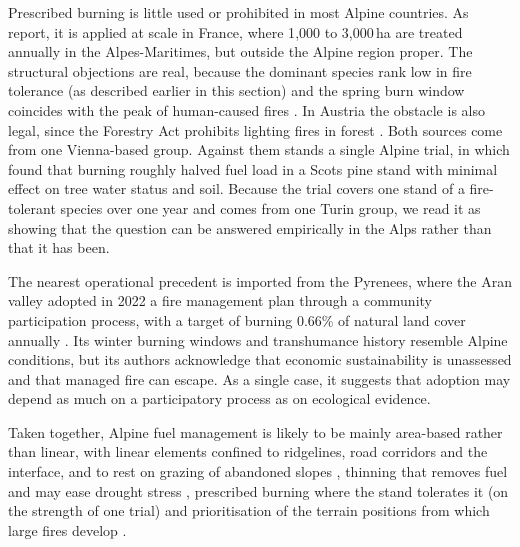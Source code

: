 \documentclass[11pt,a4paper]{article}
\begin{document}
Prescribed burning is little used or prohibited in most Alpine countries. As \citet{muller_forest_2020} report, it is applied at scale in France, where 1{,}000 to 3{,}000\,ha are treated annually in the Alpes-Maritimes, but outside the Alpine region proper. The structural objections are real, because the dominant species rank low in fire tolerance (as described earlier in this section) and the spring burn window coincides with the peak of human-caused fires \citep{muller_forest_2020}. In Austria the obstacle is also legal, since the Forestry Act prohibits lighting fires in forest \citep{neumann_fuel_2022}. Both sources come from one Vienna-based group. Against them stands a single Alpine trial, in which \citet{gamba_prescribed_2025} found that burning roughly halved fuel load in a Scots pine stand with minimal effect on tree water status and soil. Because the trial covers one stand of a fire-tolerant species over one year and comes from one Turin group, we read it as showing that the question can be answered empirically in the Alps rather than that it has been.

The nearest operational precedent is imported from the Pyrenees, where the Aran valley adopted in 2022 a fire management plan through a community participation process, with a target of burning 0.66\% of natural land cover annually \citep{oliveres_path_2025}. Its winter burning windows and transhumance history resemble Alpine conditions, but its authors acknowledge that economic sustainability is unassessed and that managed fire can escape. As a single case, it suggests that adoption may depend as much on a participatory process as on ecological evidence.

Taken together, Alpine fuel management is likely to be mainly area-based rather than linear, with linear elements confined to ridgelines, road corridors and the interface, and to rest on grazing of abandoned slopes \citep{rouetleduc_effects_2021}, thinning that removes fuel and may ease drought stress \citep{giuggiola_droughtinduced_2010}, prescribed burning where the stand tolerates it (on the strength of one trial) \citep{gamba_prescribed_2025} and prioritisation of the terrain positions from which large fires develop \citep{conedera_linking_2024}.
\end{document}
